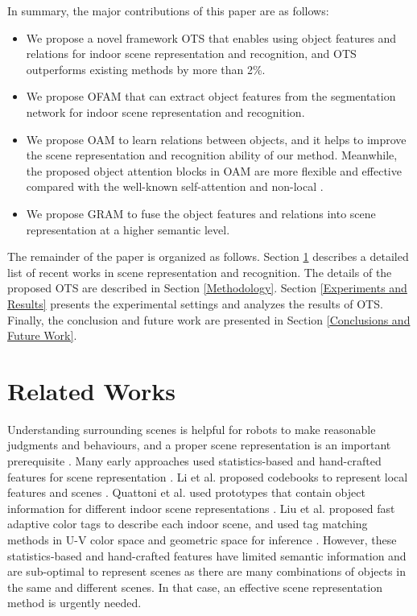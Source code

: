 \documentclass[letterpaper, 10 pt, conference]{ieeeconf}  %
\begin{document}
In summary, the major contributions of this paper are as follows:

\begin{itemize}
  \vspace{1mm}
  \item  We propose a novel framework OTS that enables using object features and relations for indoor scene representation and recognition, and OTS outperforms existing methods by more than 2\%.
  \vspace{1mm}
  \item We propose OFAM that can extract object features from the segmentation network for indoor scene representation and recognition.
  \vspace{1mm}
  \item We propose OAM to learn relations between objects, and it helps to improve the scene representation and recognition ability of our method. Meanwhile, the proposed object attention blocks in OAM are more flexible and effective compared with the well-known self-attention \cite{Zhang2019} and non-local \cite{Wang2017}.
  \vspace{1mm}
  \item We propose GRAM to fuse the object features and relations into scene representation at a higher semantic level.
\end{itemize}

The remainder of the paper is organized as follows. Section \ref{Related Works} describes a detailed list of recent works in scene representation and recognition. The details of the proposed OTS are described in Section \ref{Methodology}. Section \ref{Experiments and Results} presents the experimental settings and analyzes the results of OTS. Finally, the conclusion and future work are presented in Section \ref{Conclusions and Future Work}.

\vspace{2mm}
\section{Related Works}
\label{Related Works}

Understanding surrounding scenes is helpful for robots to make reasonable judgments and behaviours, and a proper scene representation is an important prerequisite \cite{Liao2016, Ye2017, Yan2019}. Many early approaches used statistics-based and hand-crafted features for scene representation \cite{Lazebnik2006, Khan2014}. Li et al. proposed codebooks to represent local features and scenes \cite{Fei-Fei2005}. Quattoni et al. used prototypes that contain object information for different indoor scene representations \cite{Quattoni2009}. Liu et al. proposed fast adaptive color tags to describe each indoor scene, and used tag matching methods in U-V color space and geometric space for inference \cite{Liu2009}. However, these statistics-based and hand-crafted features have limited semantic information and are sub-optimal to represent scenes as there are many combinations of objects in the same and different scenes. In that case, an effective scene representation method is urgently needed.
\end{document}
